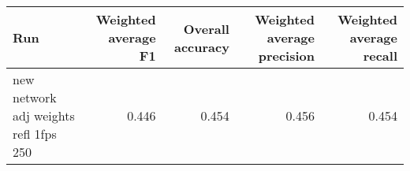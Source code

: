 \begin{tabular}{lrrrr}
\toprule
Run & Weighted average F1 & Overall accuracy & Weighted average precision & Weighted average recall \\
\midrule
new network adj weights refl 1fps 250 & 0.446 & 0.454 & 0.456 & 0.454 \\
\bottomrule
\end{tabular}
